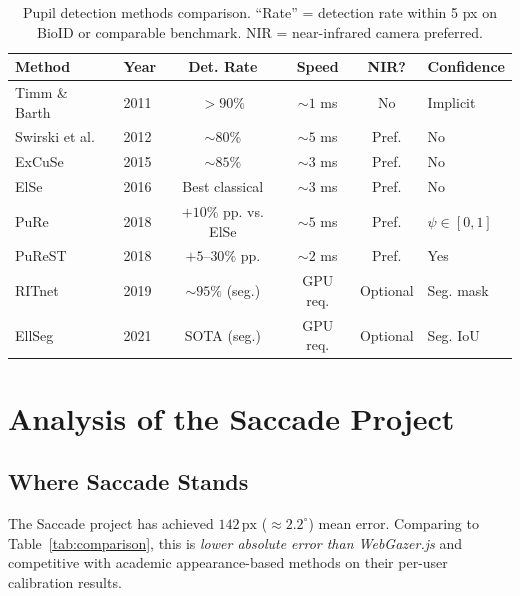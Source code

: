\documentclass[11pt,a4paper]{article}
\begin{document}
\begin{table}[H]
  \centering
  \caption{Pupil detection methods comparison. ``Rate'' = detection rate within 5 px on BioID or comparable benchmark. NIR = near-infrared camera preferred.}
  \small
  \begin{tabular}{llcccl}
    \toprule
    \textbf{Method} & \textbf{Year} & \textbf{Det. Rate} & \textbf{Speed} & \textbf{NIR?} & \textbf{Confidence} \\
    \midrule
    Timm \& Barth~\cite{timm2011accurate}   & 2011 & $>90\%$ & ${\sim}1$ ms  & No  & Implicit \\
    Swirski et al.~\cite{swirski2012robust} & 2012 & ${\sim}80\%$ & ${\sim}5$ ms & Pref. & No \\
    ExCuSe~\cite{fuhl2015excuse}             & 2015 & ${\sim}85\%$ & ${\sim}3$ ms & Pref. & No \\
    ElSe~\cite{fuhl2016else}                 & 2016 & Best classical & ${\sim}3$ ms & Pref. & No \\
    PuRe~\cite{santini2018pure}              & 2018 & $+10\%$ pp. vs. ElSe & ${\sim}5$ ms & Pref. & $\psi \in [0,1]$ \\
    PuReST~\cite{santini2018purest}          & 2018 & $+5$--$30\%$ pp. & ${\sim}2$ ms & Pref. & Yes \\
    RITnet~\cite{ritnet2019}                 & 2019 & ${\sim}95\%$ (seg.) & GPU req. & Optional & Seg. mask \\
    EllSeg~\cite{ellseg2021}                 & 2021 & SOTA (seg.) & GPU req. & Optional & Seg. IoU \\
    \bottomrule
  \end{tabular}
\end{table}

\section{Analysis of the Saccade Project}
\label{sec:saccade}

\subsection{Where Saccade Stands}

The Saccade project has achieved $142\,\text{px}$ (${\approx}2.2^\circ$) mean error.
Comparing to Table~\ref{tab:comparison}, this is \textit{lower absolute error than WebGazer.js} and competitive with academic appearance-based methods on their per-user calibration results.
\end{document}
